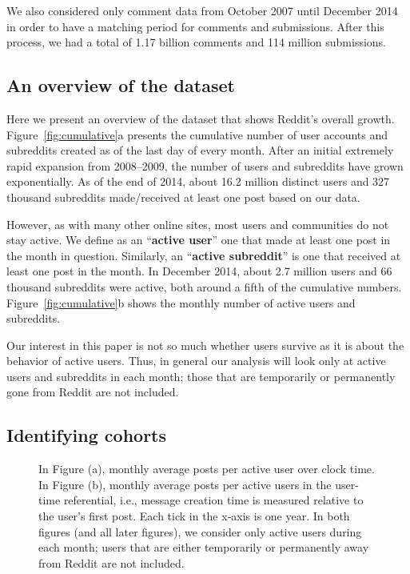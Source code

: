 We also considered only comment data from October 2007 until December 2014 in order to have a matching period for comments and submissions. After this process, we had a total of 1.17 billion comments and 114 million submissions.

\subsection{An overview of the dataset}

Here we present an overview of the dataset that shows Reddit's overall growth.  Figure~\ref{fig:cumulative}a presents the cumulative number of user accounts and subreddits created as of the last day of every month. After an initial extremely rapid expansion from 2008--2009, the number of users and subreddits have grown exponentially.  As of the end of 2014, about 16.2 million distinct users and 327 thousand subreddits made/received at least one post based on our data.

However, as with many other online sites, most users \cite{Scellato2011,Hughes2009,Java2007} and communities \cite{Arguello2006} do not stay active. We define as an ``\textbf{active user}'' one that made at least one post in the month in question. Similarly, an ``\textbf{active subreddit}'' is one that received at least one post in the month. In December 2014, about 2.7 million users and 66 thousand subreddits were active, both around a fifth of the cumulative numbers. Figure~\ref{fig:cumulative}b shows the monthly number of active users and subreddits.

Our interest in this paper is not so much whether users survive as it is about the behavior of active users.  Thus, 
in general our analysis will look only at active users and subreddits in each month; those that are temporarily or permanently gone from Reddit are not included.  

\subsection{Identifying cohorts}

\begin{figure}[!tb]
\centering
{}
\caption{In Figure (a), monthly average posts per active user over clock time. In Figure (b), monthly average posts per active users in the user-time referential, i.e., message creation time is measured relative to the user's first post.  Each tick in the x-axis is one year.  In both figures (and all later figures), we consider only active users during each month; users that are either temporarily or permanently away from Reddit are not included.}
\label{fig:overall_posts}
\end{figure}

